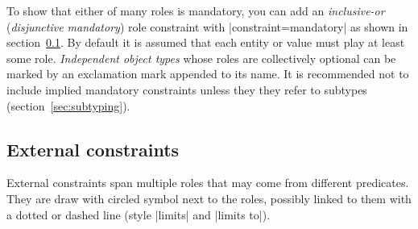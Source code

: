 \documentclass[a4paper,10pt]{article}
\begin{document}
\noindent To show that either of many roles is mandatory, you can add an \emph{inclusive-or} (\emph{disjunctive mandatory}) role constraint with |constraint=mandatory| as shown in section~\ref{sec:externalconstraints}. By default it is assumed that each entity or value must play at least some role. \emph{Independent object types} whose roles are collectively optional can be marked by an exclamation mark appended to its name. It is recommended not to include implied mandatory constraints unless they they refer to subtypes (section~\ref{sec:subtyping}).


\subsection{External constraints}
\label{sec:externalconstraints}
External constraints span multiple roles that may come from different predicates. They are draw with circled symbol next to the roles, possibly linked to them with a dotted or dashed line (style |limits| and |limits to|).
\end{document}
